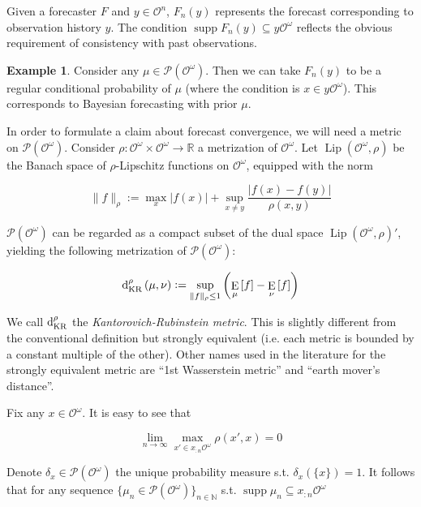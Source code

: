 \documentclass[aop,preprint]{imsart}
\numberwithin{equation}{section}
\theoremstyle{definition}
\newtheorem{example}{Example}[section]
\theoremstyle{plain}
\newcommand{\Nats}{\mathbb{N}}
\newcommand{\Reals}{\mathbb{R}}
\newcommand{\A}[1]{\lvert #1 \rvert}
\newcommand{\N}[1]{\lVert #1 \rVert}
\newcommand{\Sq}[2]{\{#1\}_{#2 \in \Nats}}
\newcommand{\Sqn}[1]{\Sq{#1}{n}}
\DeclareMathOperator{\E}{E}
\newcommand{\PM}{\mathcal{P}}
\newcommand{\Lp}{{\operatorname{Lip}}}
\DeclareMathOperator{\Sp}{supp}
\newcommand{\DKR}{\operatorname{d}_{\textnormal{KR}}}
\newcommand{\Ob}{\mathcal{O}}
\newcommand{\OO}{\Ob^\omega}
\newcommand{\PMO}{\PM(\OO)}
\begin{document}
Given a forecaster $F$ and $y \in \Ob^n$, $F_n\left(y\right)$ represents the forecast corresponding to observation history $y$. The condition $\Sp {F_n\left(y\right)} \subseteq y\OO$ reflects the obvious requirement of consistency with past observations.

\begin{samepage}
\begin{example}

Consider any $\mu\in\PMO$. Then we can take $F_n(y)$ to be a regular conditional probability of $\mu$ (where the condition is $x \in y\OO$). This corresponds to Bayesian forecasting with prior $\mu$.

\end{example}
\end{samepage}

In order to formulate a claim about forecast convergence, we will need a metric on $\PMO$. Consider $\rho: \OO \times \OO \rightarrow \Reals$ a metrization of $\OO$. Let $\Lp\left(\OO,\rho\right)$ be the Banach space of $\rho$-Lipschitz functions on $\OO$, equipped with the norm

\begin{equation}
\N{f}_\rho:=\max_{x}{\A{f\left(x\right)}} + \sup_{x \ne y} \frac{\A{f\left(x\right)-f\left(y\right)}}{\rho\left(x,y\right)}
\end{equation}

$\PMO$ can be regarded as a compact subset of the dual space $\Lp\left(\OO,\rho\right)'$, yielding the following metrization of $\PMO$:

\begin{equation}
\DKR^\rho\left(\mu,\nu\right):=\sup_{\N{f}_\rho \leq 1}{\left(\E_\mu\left[f\right] - \E_\nu\left[f\right]\right)}
\end{equation}

We call $\DKR^\rho$ the \emph{Kantorovich-Rubinstein metric}. This is slightly different from the conventional definition but strongly equivalent (i.e. each metric is bounded by a constant multiple of the other). Other names used in the literature for the strongly equivalent metric are \enquote{1st Wasserstein metric} and \enquote{earth mover's distance}.

Fix any $x \in \OO$. It is easy to see that

\begin{equation}
\lim_{n \rightarrow \infty} \max_{x' \in x_{:n}\OO} \rho\left(x', x\right) = 0
\end{equation}

Denote $\delta_x \in \PMO$ the unique probability measure s.t. $\delta_x\left(\{x\}\right)=1$. It follows that for any sequence $\Sqn{\mu_n \in \PMO}$ s.t. $\Sp{\mu_n} \subseteq x_{:n}\OO$
\end{document}
